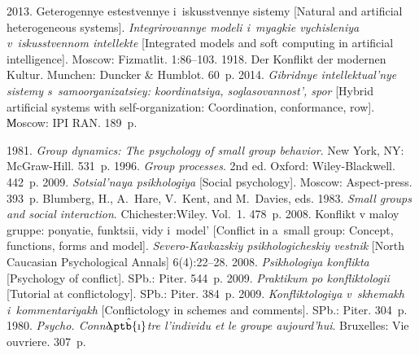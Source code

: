  






  \begin{multicols}{2}

\renewcommand{\bibname}{\protect\rmfamily References}

{\small\frenchspacing
 {%
 \begin{thebibliography}{99}
 2013. Geterogennye estestvennye i~is\-kus\-stvennye sistemy 
[Natural and artificial heterogeneous systems]. \textit{Integrirovannye modeli
i~myagkie vychisleniya v~iskusstvennom intellekte}
[Integrated models and 
soft computing in artificial intelligence]. 
Moscow: Fizmatlit. 1:86--103. 
 1918. Der Konflikt der modernen Kultur. Munchen: Duncker \& 
Humblot. 60~p.
 2014. 
\textit{Gibridnye intellektual'nye sistemy s~samoorganizatsiey: koordinatsiya, 
soglasovannost', spor} [Hybrid artificial systems with self-organization: 
Coordination, conformance, row]. Мoscow: IPI RAN. 189~p. 

 1981. \textit{Group dynamics: The psychology of small group 
behavior}. New York, NY: McGraw-Hill. 531~p.
 1996. \textit{Group processes}. 2nd ed. Oxford: Wiley-Blackwell. 
442~p.
 2009. \textit{Sotsial'naya psikhologiya} [Social psychology]. 
Moscow: Aspect-press. 393~p.
Blumberg, H., A.~Hare, V.~Kent, and M.~Davies, eds. 1983. \textit{Small groups 
and social interaction}. Chichester:\linebreak Wiley. Vol.~1. 478~p.
 2008. Konflikt v maloy gruppe: po\-nya\-tie, funktsii, vidy 
i~model' [Conflict in a~small group: Concept, functions, forms and model].  
\textit{Severo-Kavkazskiy psikhologicheskiy vestnik} [North Caucasian 
Psychological Annals] 6(4):22--28.
 2008. \textit{Psikhologiya konflikta} [Psychology of conflict]. 
SPb.: Piter. 544~p.
 2009. \textit{Praktikum po konfliktologii} [Tutorial at 
conflictology]. SPb.: Piter. 384~p.
 2009. \textit{Konfliktologiya 
v~skhemakh i~kommentariyakh} [Conflictology in schemes and 
comments]. SPb.: Piter. 304~p.
 1980. \textit{Psycho. 
Conna$\hat{\mbox{\normalsize\!\!\ptb{\i}}}$tre l'individu et le groupe aujourd'hui}. Bruxelles: Vie 
ouvriere. 307~p.


\end{thebibliography}}}
\end{multicols}
